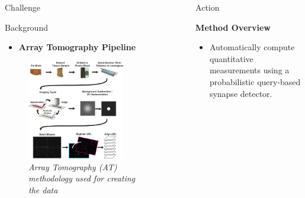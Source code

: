 \documentclass[final, table]{beamer}
\newlength{\sepwid}
\newlength{\onecolwid}
\newlength{\twocolwid}
\begin{document}
\begin{frame}[t]
\begin{columns}[t]
\begin{column}{\onecolwid}
\begin{block}{Challenge}
\end{block}
\vspace{1in}

\begin{block}{Background} 

\begin{itemize} 
\item \textbf{Array Tomography Pipeline}
\end{itemize} 

\begin{figure}
\centering
\includegraphics[width=0.8\textwidth]{figs/at_diagram3}
\caption{\textit{Array Tomography (AT) methodology used for creating the data \cite{Weiler}}}
\end{figure}




\end{block} 


\end{column}

\begin{column}{\sepwid}\end{column}  %
\begin{column}{\twocolwid}




\begin{block}{Action}

\textbf{Method Overview}

\begin{itemize} 
\item Automatically compute quantitative measurements using a probabilistic query-based synapse detector.
%
\end{itemize} 


\end{block}
\end{column}
\end{columns}
\end{frame}
\end{document}
